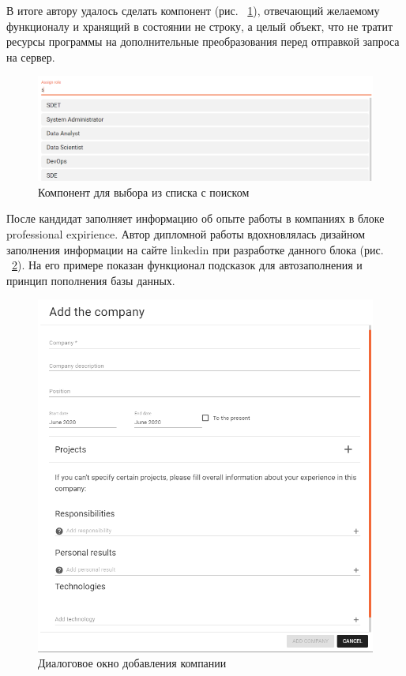 \documentclass[12pt, a4paper]{diplom}
\begin{document}
В итоге автору удалось сделать компонент (рис. ~\ref{8}), отвечающий желаемому функционалу и хранящий в состоянии не строку, а целый объект, что
не тратит ресурсы программы на дополнительные преобразования перед отправкой запроса на сервер.

\begin{figure}[!ht]
\centering
\includegraphics[width=1\textwidth]{resources/role.png}
\caption{Компонент для выбора из списка с поиском}
\label{8}
\end{figure}

После кандидат заполняет информацию об опыте работы в компаниях в блоке professional expirience. Автор дипломной работы вдохновлялась дизайном заполнения информации на сайте linkedin при разработке данного блока (рис. ~\ref{9}).
На его примере показан функционал подсказок для автозаполнения и принцип пополнения базы данных.
\begin{figure}[!ht]
\centering
\includegraphics[width=1\textwidth]{resources/companycard.png}
\caption{Диалоговое окно добавления компании}
\label{9}
\end{figure}
\end{document}
